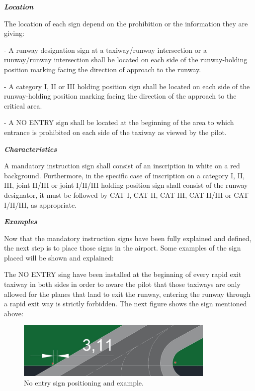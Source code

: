 	\textbf{\textit{Location}}
	
	The location of each sign depend on the prohibition or the information they are giving:
	
	- A runway designation sign at a taxiway/runway intersection or a runway/runway intersection shall be located on each side of the runway-holding position marking facing the direction of approach to the runway.
	
	- A category I, II or III holding position sign shall be located on each side of the runway-holding position marking facing the direction of the approach to the critical area.
	
	- A NO ENTRY sign shall be located at the beginning of the area to which entrance is prohibited on each side of the taxiway as viewed by the pilot.
	
	\textbf{\textit{Characteristics}}
	
	A mandatory instruction sign shall consist of an inscription in white on a red background. Furthermore, in the specific case of inscription on a category I, II, III, joint II/III or joint I/II/III holding position sign shall consist of the runway designator, it must be followed by CAT I, CAT II, CAT III, CAT II/III or CAT I/II/III, as appropriate.
	
	\textbf{\textit{Examples}}
	
	Now that the mandatory instruction signs have been fully explained and defined, the next step is to place those signs in the airport. Some examples of the sign placed will be shown and explained:
	
	The NO ENTRY sing have been installed at the beginning of every rapid exit taxiway in both sides in order to aware the pilot that those taxiways are only allowed for the planes that land to exit the runway, entering the runway through a rapid exit way is strictly forbidden. The next figure shows the sign mentioned above:
	
	\begin{figure}[H]
		\centering
		\includegraphics[clip, trim=0cm 0cm 0cm 0cm, width=0.85\textwidth]{./images/signsexamples/NOentrysign}
		\caption{No entry sign positioning and example.} %
		\label{} %
	\end{figure}
	 
